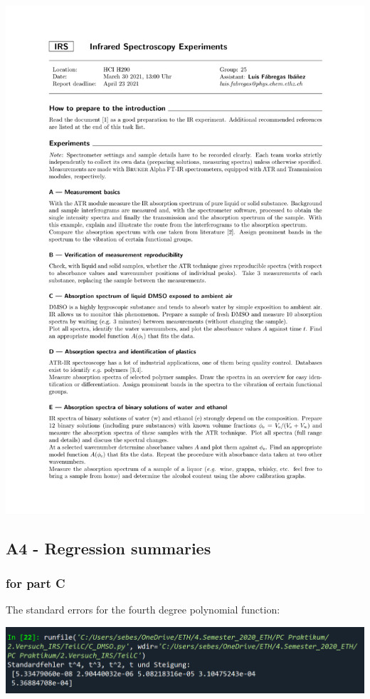 \documentclass[a4paper,abstracton]{article}	                       %
\begin{document}
\includegraphics[page = 2,width=\textwidth]{Task.pdf}

\subsection*{A4 - Regression summaries}
\subsubsection*{for part C}
The standard errors for the fourth degree polynomial function:

\includegraphics[width=\textwidth]{StandardfehlerC.PNG}
\end{document}
